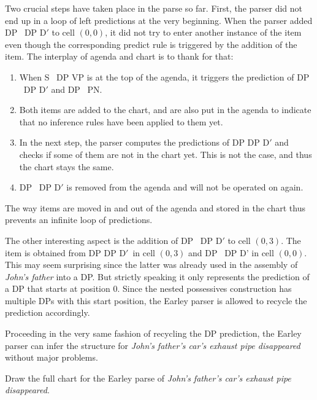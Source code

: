 \begin{examplebox}
\begin{center}
    \end{center}

    Two crucial steps have taken place in the parse so far.
    First, the parser did not end up in a loop of left predictions at the very beginning.
    When the parser added DP \rewrite\ \psep DP D$'$ to cell $(0,0)$, it did not try to enter another instance of the item even though the corresponding predict rule is triggered by the addition of the item.
    The interplay of agenda and chart is to thank for that:
    \begin{enumerate}
        \item When S \rewrite\ \psep DP VP is at the top of the agenda, it triggers the prediction of DP \rewrite\ \psep DP D$'$ and DP \rewrite\ \psep PN\@.
        \item Both items are added to the chart, and are also put in the agenda to indicate that no inference rules have been applied to them yet.
        \item In the next step, the parser computes the predictions of DP \rewrite \psep DP D$'$ and checks if some of them are not in the chart yet.
            This is not the case, and thus the chart stays the same.
        \item DP \rewrite\ \psep DP D$'$ is removed from the agenda and will not be operated on again.
    \end{enumerate}
    The way items are moved in and out of the agenda and stored in the chart thus prevents an infinite loop of predictions.

    The other interesting aspect is the addition of DP \rewrite\ DP \psep D$'$ to cell $(0,3)$.
    The item is obtained from DP \rewrite DP D$'$\psep\ in cell $(0,3)$ and DP \rewrite\ \psep DP D' in cell $(0,0)$.
    This may seem surprising since the latter was already used in the assembly of \emph{John's father} into a DP\@.
    But strictly speaking it only represents the prediction of a DP that starts at position 0.
    Since the nested possessives construction has multiple DPs with this start position, the Earley parser is allowed to recycle the prediction accordingly.

    Proceeding in the very same fashion of recycling the DP prediction, the Earley parser can infer the structure for \emph{John's father's car's exhaust pipe disappeared} without major problems.
\end{examplebox}
%
\begin{exercise}
    Draw the full chart for the Earley parse of \emph{John's father's car's exhaust pipe disappeared}.
\end{exercise}

